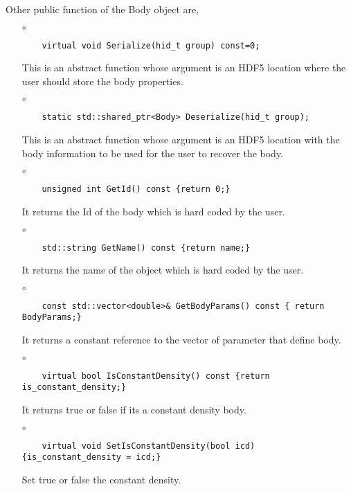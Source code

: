 Other public function of the {\ttf Body} object are,

\begin{itemize}
\item[$\circ$]  
  \begin{lstlisting}
    virtual void Serialize(hid_t group) const=0;
  \end{lstlisting}
  This is an abstract function whose argument is an HDF5 location
  where the user should store the body properties.

  \item[$\circ$]  
  \begin{lstlisting}
    static std::shared_ptr<Body> Deserialize(hid_t group);
  \end{lstlisting}
  This is an abstract function whose argument is an HDF5 location
  with the body information to be used for the user to recover the body.
  
\item[$\circ$]  
  \begin{lstlisting}
    unsigned int GetId() const {return 0;}
  \end{lstlisting}
  It returns the Id of the body which is hard coded by the user.

\item[$\circ$]  
  \begin{lstlisting}
    std::string GetName() const {return name;}
  \end{lstlisting}
  It returns the name of the object which is hard coded by the user.

\item[$\circ$]  
  \begin{lstlisting}
    const std::vector<double>& GetBodyParams() const { return BodyParams;}
  \end{lstlisting}
  It returns a constant reference to the vector of parameter that define body. 
  
  \item[$\circ$]  
  \begin{lstlisting}
    virtual bool IsConstantDensity() const {return is_constant_density;}
  \end{lstlisting}
  It returns true or false if its a constant density body.
  
\item[$\circ$]  
  \begin{lstlisting}
    virtual void SetIsConstantDensity(bool icd) {is_constant_density = icd;}
  \end{lstlisting}
  Set true or false the constant density. 
\end{itemize}


